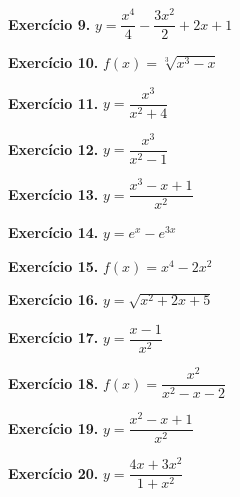 \documentclass[12pt,a4paper]{article}
\begin{document}
\vspace{0.5cm}
\noindent\textbf{Exercício 9.} $y = \dfrac{x^4}{4} - \dfrac{3x^2}{2} + 2x + 1$

\vspace{0.5cm}
\noindent\textbf{Exercício 10.} $f(x) = \sqrt[3]{x^3 - x}$

\vspace{0.5cm}
\noindent\textbf{Exercício 11.} $y = \dfrac{x^3}{x^2 + 4}$

\vspace{0.5cm}
\noindent\textbf{Exercício 12.} $y = \dfrac{x^3}{x^2 - 1}$

\vspace{0.5cm}
\noindent\textbf{Exercício 13.} $y = \dfrac{x^3 - x + 1}{x^2}$

\vspace{0.5cm}
\noindent\textbf{Exercício 14.} $y = e^x - e^{3x}$

\vspace{0.5cm}
\noindent\textbf{Exercício 15.} $f(x) = x^4 - 2x^2$

\vspace{0.5cm}
\noindent\textbf{Exercício 16.} $y = \sqrt{x^2 + 2x + 5}$

\vspace{0.5cm}
\noindent\textbf{Exercício 17.} $y = \dfrac{x - 1}{x^2}$

\vspace{0.5cm}
\noindent\textbf{Exercício 18.} $f(x) = \dfrac{x^2}{x^2 - x - 2}$

\vspace{0.5cm}
\noindent\textbf{Exercício 19.} $y = \dfrac{x^2 - x + 1}{x^2}$

\vspace{0.5cm}
\noindent\textbf{Exercício 20.} $y = \dfrac{4x + 3x^2}{1 + x^2}$
\end{document}
